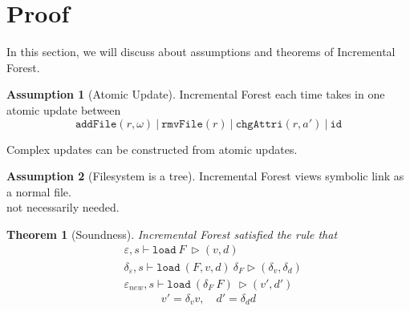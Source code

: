 \documentclass[10pt,twoside,a4paper]{article}
\theoremstyle{theorem}
\newtheorem{theorem}{Theorem}[section]
\theoremstyle{lemma}
\theoremstyle{property}
\theoremstyle{definition}
\theoremstyle{assumption}
\newtheorem{assumption}{Assumption}[section]
\begin{document}
\newpage
\section{Proof}
In this section, we will discuss about assumptions and theorems of Incremental Forest.
\begin{assumption}[Atomic Update]
	Incremental Forest each time takes in one atomic update between 
	\begin{displaymath}
		\mathtt{addFile}(r,\omega) ~|~ \mathtt{rmvFile}(r) ~|~ \mathtt{chgAttri}(r,a') ~|~  \mathtt{id}
	\end{displaymath}

\end{assumption}

Complex updates can be constructed from atomic updates.

\begin{assumption}[Filesystem is a tree]
	Incremental Forest views symbolic link as a normal file. \\
	not necessarily needed.
\end{assumption}

\begin{theorem}[Soundness]
	Incremental Forest satisfied the rule that
	\begin{align*}
		& \varepsilon, s \vdash \mathtt{load}~ F~ \rhd (v,d)\\
		& \delta_\varepsilon, s \vdash \mathtt{load}~ (F,v,d)~ \delta_F \rhd (\delta_v,\delta_d)\\
		& \varepsilon_{new}, s \vdash \mathtt{load}~ (\delta_F~F)~ \rhd (v',d')
	\end{align*}
	\begin{displaymath}
		v' = \delta_v v, \quad d' = \delta_d d
	\end{displaymath}
\end{theorem}
\end{document}
